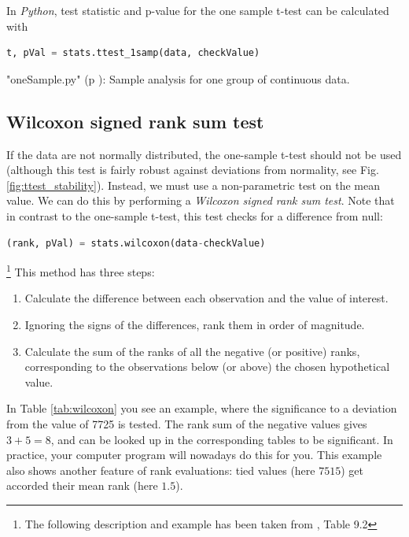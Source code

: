 In \emph{Python}, test statistic and p-value for the one sample t-test can be calculated with

\begin{lstlisting}[language=Python]
      t, pVal = stats.ttest_1samp(data, checkValue)
\end{lstlisting}

\PyImg "oneSample.py" (p \pageref{py:oneSample}): Sample analysis for one group of continuous data.

\subsection{Wilcoxon signed rank sum test}

If the data are not normally distributed, the one-sample t-test should not be used (although this test is fairly robust against deviations from normality, see Fig. \ref{fig:ttest_stability}). Instead, we must use a non-parametric test on the mean value. We can do this by performing a \emph{Wilcoxon signed rank sum test}. Note that in contrast to the one-sample t-test, this test checks for a difference from null:

\begin{lstlisting}[language=Python]
    (rank, pVal) = stats.wilcoxon(data-checkValue)
\end{lstlisting}

\footnote{The following description and example has been taken from \cite{altman99}, Table 9.2}
This method has three steps:

\begin{enumerate}
  \item Calculate the difference between each observation and the value of interest.
  \item Ignoring the signs of the differences, rank them in order of magnitude.
  \item Calculate the sum of the ranks of all the negative (or positive) ranks, corresponding to the observations below (or above) the chosen hypothetical value.
\end{enumerate}

In Table \ref{tab:wilcoxon} you see an example, where the significance to a deviation from the value of 7725 is tested. The rank sum of the negative values gives $3+5=8$, and can be looked up in the corresponding tables to be significant. In practice, your computer program will nowadays do this for you. This example also shows another feature of rank evaluations: tied values (here $7515$) get accorded their mean rank (here $1.5$).

